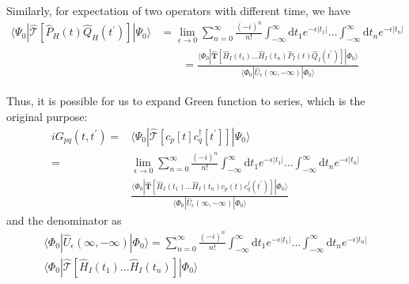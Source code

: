 Similarly, for expectation of two operators with different time, we have
\begin{equation}
\begin{aligned}
	\langle\Psi_{0}|\hat{\mathcal{T}}\left[\hat{P}_{H}(t) \hat{Q}_{H}\left(t^{\prime}\right)\right]| \Psi_{0}\rangle
	&=\lim _{\epsilon \rightarrow 0} \sum_{n=0}^{\infty} \frac{(-i)^{n}}{n !} \int_{-\infty}^{\infty} \mathrm{d} t_{1} e^{-\epsilon|t_{1}|} \ldots \int_{-\infty}^{\infty} \mathrm{d} t_{n} e^{-\epsilon|t_{n}|}
	\\
	&\qquad =\frac{\langle\Phi_{0}|
	\hat{\boldsymbol{T}}\left[\hat{H}_{I}\left(t_{1}\right) \ldots \hat{H}_{I}\left(t_{n}\right) \hat{P}_{I}(t) \hat{Q}_{I}\left(t^{\prime}\right)\right]|
	\Phi_{0}\rangle}
	{\langle\Phi_{0}|\hat{U}_{\epsilon}(\infty,-\infty)| \Phi_{0}\rangle}
\end{aligned}
\end{equation}

Thus, it is possible for us to expand Green function to series, which is the original purpose:
\begin{equation} \label{greenexp}
\begin{aligned}
	i G_{p q}\left(t, t^{\prime}\right)
	=&\langle\Psi_{0}|
	\hat{\mathcal{T}}\left[c_{p}[t] c_{q}^{\dagger}\left[t^{\prime}\right]\right]|
	\Psi_{0}\rangle
	\\
	=& \lim _{\epsilon \rightarrow 0} \sum_{n=0}^{\infty} \frac{(-i)^{n}}{n !} 
	\int_{-\infty}^{\infty} \mathrm{d} t_{1} e^{-\epsilon|t_{1}|} \ldots \int_{-\infty}^{\infty} \mathrm{d} t_{n} e^{-\epsilon|t_{n}|}
	\\
	& \frac{\langle\Phi_{0}|
	\hat{\boldsymbol{T}}\left[\hat{H}_{I}\left(t_{1}\right) \ldots \hat{H}_{I}\left(t_{n}\right) c_{p}(t) c_{q}^{\dagger}\left(t^{\prime}\right)\right]|
	\Phi_{0}\rangle}
	{\langle\Phi_{0}|
	\hat{U}_{\epsilon}(\infty,-\infty)|
	\Phi_{0}\rangle}
\end{aligned}
\end{equation}
and the denominator as
\begin{equation}
\begin{aligned}\langle\Phi_{0}|\hat{U}_{\epsilon}(\infty,-\infty)| \Phi_{0}\rangle=\sum_{n=0}^{\infty} \frac{(-i)^{n}}{n !} \int_{-\infty}^{\infty} \mathrm{d} t_{1} e^{-\epsilon|t_{1}|} \ldots \int_{-\infty}^{\infty} \mathrm{d} t_{n} e^{-\epsilon|t_{n}|} \\\langle\Phi_{0}|\hat{\mathcal{T}}\left[\hat{H}_{I}\left(t_{1}\right) \ldots \hat{H}_{I}\left(t_{n}\right)\right]| \Phi_{0}\rangle \end{aligned}
\end{equation}

